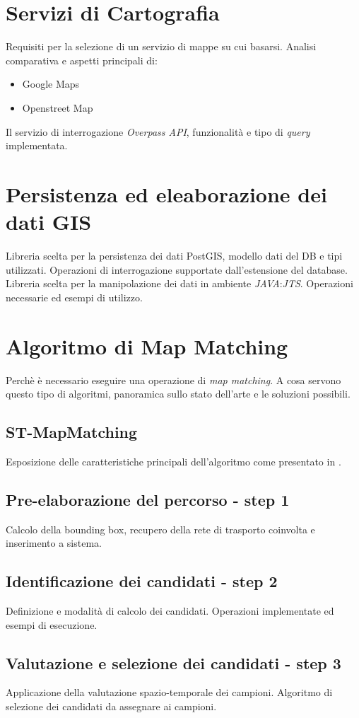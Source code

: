 \documentclass[a4paper, 12pt, twoside, openright]{book}
\begin{document}
\section{Servizi di Cartografia}
Requisiti per la selezione di un servizio di mappe su cui basarsi. Analisi comparativa e aspetti principali di:
\begin{itemize}
\item Google Maps
\item Openstreet Map
\end{itemize}
Il servizio di interrogazione \emph{Overpass API}, funzionalità e tipo di \emph{query} implementata.

\section{Persistenza ed eleaborazione dei dati GIS}
Libreria scelta per la persistenza dei dati PostGIS, modello dati del DB e tipi utilizzati. Operazioni di interrogazione supportate dall'estensione del database.
Libreria scelta per la manipolazione dei dati in ambiente \emph{JAVA}:\emph{JTS}. Operazioni necessarie ed esempi di utilizzo. 

\section{Algoritmo di Map Matching}
Perchè è necessario eseguire una operazione di \emph{map matching}. A cosa servono questo tipo di algoritmi, panoramica sullo stato dell'arte e le soluzioni possibili.
\subsection{ST-MapMatching}
Esposizione delle caratteristiche principali dell'algoritmo come presentato in \cite{stmapmatching}.
\subsection{Pre-elaborazione del percorso - step 1}
Calcolo della bounding box, recupero della rete di trasporto coinvolta e inserimento a sistema.
\subsection{Identificazione dei candidati - step 2}
Definizione e modalità di calcolo dei candidati. Operazioni implementate ed esempi di esecuzione.
\subsection{Valutazione e selezione dei candidati - step 3}
Applicazione della valutazione spazio-temporale dei campioni. Algoritmo di selezione dei candidati da assegnare ai campioni. 
\end{document}
